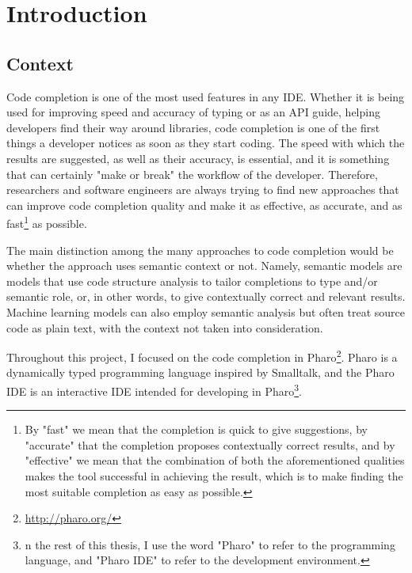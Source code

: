 \chapter{Introduction}
\label{chap:Introduction}

\section{Context}
\label{sec:Introduction-Context}
Code completion is one of the most used features in any IDE. Whether it is being used for improving speed and accuracy of typing or as an API guide, helping developers find their way around libraries, code completion is one of the first things a developer notices as soon as they start coding. The speed with which the results are suggested, as well as their accuracy, is essential, and it is something that can certainly "make or break" the workflow of the developer. Therefore, researchers and software engineers are always trying to find new approaches that can improve code completion quality and make it as effective, as accurate, and as fast\footnote{By "fast" we mean that the completion is quick to give suggestions, by "accurate" that the completion proposes contextually correct results, and by "effective" we mean that the combination of both the aforementioned qualities makes the tool successful in achieving the result, which is to make finding the most suitable completion as easy as possible.} as possible.

The main distinction among the many approaches to code completion would be whether the approach uses semantic context or not. Namely, semantic models are models that use code structure analysis to tailor completions to type and/or semantic role, or, in other words, to give contextually correct and relevant results. Machine learning models can also employ semantic analysis but often treat source code as plain text, with the context not taken into consideration.

Throughout this project, I focused on the code completion in Pharo\footnote{\url{http://pharo.org/}}. Pharo is a dynamically typed programming language inspired by Smalltalk, and the Pharo IDE is an interactive IDE intended for developing in Pharo\footnote{n the rest of this thesis, I use the word "Pharo" to refer to the programming language, and "Pharo IDE" to refer to the development environment.}.

